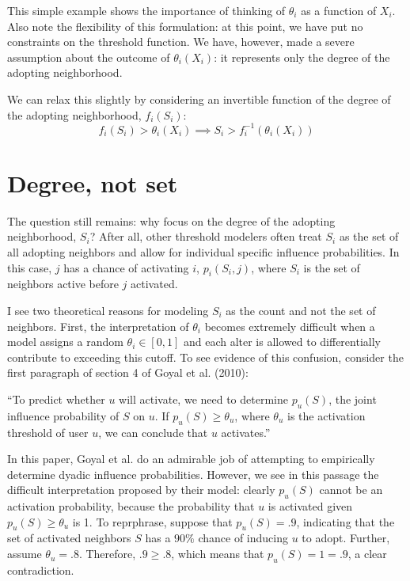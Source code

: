 \documentclass{article}
\begin{document}
This simple example shows the importance of thinking of $\theta_i$ as a function of $X_i$. Also note the flexibility of this formulation: at this point, we have put no constraints on the threshold function. We have, however, made a severe assumption about the outcome of $\theta_i(X_i)$: it represents only the degree of the adopting neighborhood.

We can relax this slightly by considering an invertible function of the degree of the adopting neighborhood, $f_i(S_i)$:
\[
f_i(S_i) > \theta_i(X_i) \implies S_i > f_i^{-1}(\theta_i(X_i))
\]



\section{Degree, not set}

The question still remains: why focus on the degree of the adopting neighborhood, $S_i$? After all, other threshold modelers often treat $S_i$ as the set of all adopting neighbors and allow for individual specific influence probabilities. In this case, $j$ has a chance of activating $i$, $p_{i}(S_i, j)$, where $S_i$ is the set of neighbors active before $j$ activated. 

I see two theoretical reasons for modeling $S_i$ as the count and not the set of neighbors. First, the interpretation of $\theta_i$ becomes extremely difficult when a model assigns a random $\theta_i \in [0,1]$ and each alter is allowed to differentially contribute to exceeding this cutoff. To see evidence of this confusion, consider the first paragraph of section 4 of Goyal et al. (2010):

``To predict whether $u$ will activate, we need to determine $p_u(S)$, the joint influence probability of $S$ on $u$. If $p_u(S) \ge \theta_u$, where $\theta_u$ is the activation threshold of user $u$, we can conclude that $u$ activates.''

In this paper, Goyal et al. do an admirable job of attempting to empirically determine dyadic influence probabilities. However, we see in this passage the difficult interpretation proposed by their model: clearly $p_u(S)$ cannot be an activation probability, because the probability that $u$ is activated given $p_u(S) \ge \theta_u$ is 1. To reprphrase, suppose that $p_u(S) = .9$, indicating that the set of activated neighbors $S$ has a $90\%$ chance of inducing $u$ to adopt. Further, assume $\theta_u = .8$. Therefore, $.9 \ge .8$, which means that $p_u(S) = 1 = .9$, a clear contradiction.
\end{document}
